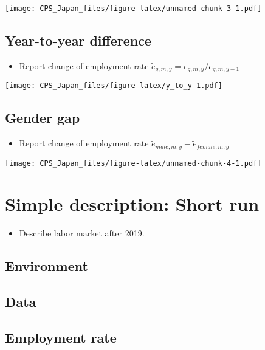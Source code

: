\documentclass[
]{book}
\providecommand{\tightlist}{%
  \setlength{\itemsep}{0pt}\setlength{\parskip}{0pt}}
\begin{document}
\texttt{[image: CPS\_Japan\_files/figure-latex/unnamed-chunk-3-1.pdf]}

\hypertarget{year-to-year-difference}{%
\section{Year-to-year difference}\label{year-to-year-difference}}

\begin{itemize}
\tightlist
\item
  Report change of employment rate \(\tilde e_{g,m,y}=e_{g,m,y}/e_{g,m,y-1}\)
\end{itemize}

\texttt{[image: CPS\_Japan\_files/figure-latex/y\_to\_y-1.pdf]}

\hypertarget{gender-gap}{%
\section{Gender gap}\label{gender-gap}}

\begin{itemize}
\tightlist
\item
  Report change of employment rate \(\tilde e_{male,m,y} - \tilde e_{female,m,y}\)
\end{itemize}

\texttt{[image: CPS\_Japan\_files/figure-latex/unnamed-chunk-4-1.pdf]}

\hypertarget{simple-description-short-run}{%
\chapter{Simple description: Short run}\label{simple-description-short-run}}

\begin{itemize}
\tightlist
\item
  Describe labor market after 2019.
\end{itemize}

\hypertarget{environment-1}{%
\section{Environment}\label{environment-1}}

\hypertarget{data-1}{%
\section{Data}\label{data-1}}

\hypertarget{employment-rate-1}{%
\section{Employment rate}\label{employment-rate-1}}
\end{document}
